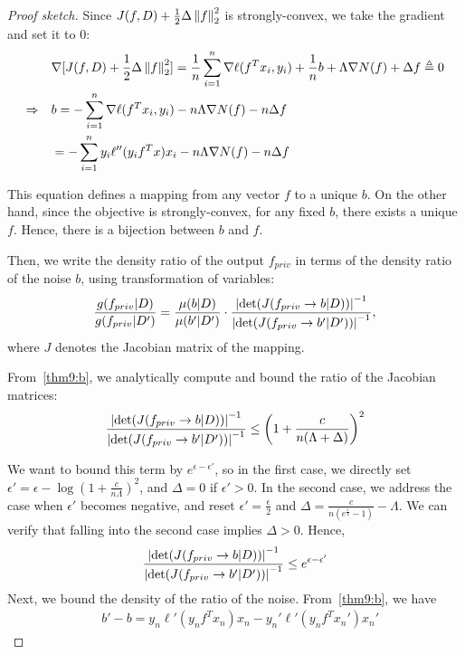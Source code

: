 \documentclass{article} %
\begin{document}
\begin{proof}[Proof sketch]
Since $J(f, D) + \frac{1}{2}\Delta \left\lVert f\right\rVert_2^2$ is strongly-convex, we take the gradient and set it to 0:
\begin{align}
& \nabla [J(f, D) +  \frac{1}{2}\Delta \left\lVert f\right\rVert_2^2]= \frac{1}{n}\sum_{i=1}^n \nabla \ell(f^T x_i, y_i) + \frac{1}{n} b+ \Lambda \nabla N(f) + \Delta f  \triangleq 0\nonumber\\
\Rightarrow \quad & b =  -\sum_{i=1}^n \nabla \ell(f^Tx_i, y_i) -n \Lambda \nabla N(f) - n\Delta f\nonumber\\
& =  -\sum_{i=1}^n y_i \ell''(y_i f^T x) x_i - n\Lambda \nabla N(f) - n\Delta f\label{thm9:b}
\end{align}

This equation defines a mapping from any vector $f$ to a unique $b$. On the other hand, since the objective is strongly-convex, for any fixed $b$, there exists a unique $f$. Hence, there is a bijection between $b$ and $f$.

Then, we write the density ratio of the output $f_{priv}$ in terms of the density ratio of the noise $b$, using transformation of variables:
\begin{align}
\frac{g(f_{priv} | D)}{g(f_{priv} | D')} = \frac{\mu(b | D)}{\mu(b' | D')} \cdot \frac{\left\lvert\det(J(f_{priv} \rightarrow b | D))\right\rvert^{-1}}{\left\lvert\det(J(f_{priv} \rightarrow b' | D'))\right\rvert^{-1}}, \label{thm9:main}
\end{align}
where $J$ denotes the Jacobian matrix of the mapping.

From~\eqref{thm9:b}, we analytically compute and bound the ratio of the Jacobian matrices:
\begin{align*}\frac{\left\lvert\det(J(f_{priv} \rightarrow b | D))\right\rvert^{-1}}{\left\lvert\det(J(f_{priv} \rightarrow b' | D'))\right\rvert^{-1}} \le \left(1 + \frac{c}{n(\Lambda + \Delta)}\right)^2
\end{align*}

We want to bound this term by $e^{\epsilon - \epsilon'}$, so in the first case, we directly set $\epsilon' = \epsilon  - \log{(1 + \frac{c}{n\Lambda})^2}$, and $\Delta = 0$ if $\epsilon' > 0$. In the second case, we address the case when $\epsilon'$ becomes negative, and reset $\epsilon' = \frac{\epsilon}{2}$ and $\Delta = \frac{c}{n(e^{\frac{\epsilon}{4}}- 1)}- \Lambda$. We can verify that falling into the second case implies $\Delta > 0$. Hence,
\begin{align}
\frac{\left\lvert\det(J(f_{priv} \rightarrow b | D))\right\rvert^{-1}}{\left\lvert\det(J(f_{priv} \rightarrow b' | D'))\right\rvert^{-1}} \le e^{\epsilon - \epsilon'} \label{thm9:ratio_jacobian}
\end{align}
Next, we bound the density of the ratio of the noise. From~\eqref{thm9:b}, we have
\begin{align*}
& b' - b = y_n \ell'(y_n f^T x_n) x_n - y_n' \ell'(y_n f^T x_n') x_n'
\end{align*}


\end{proof}
\end{document}
